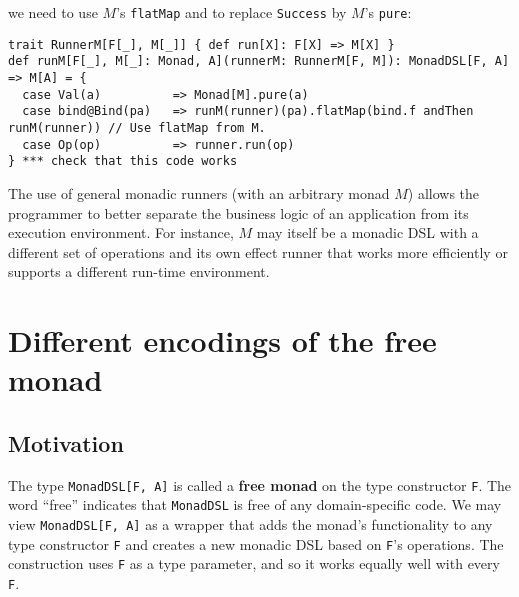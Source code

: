 we need to use $M$\textsf{'}s \lstinline!flatMap!
and to replace \lstinline!Success!
by $M$\textsf{'}s \lstinline!pure!:
\begin{lstlisting}
trait RunnerM[F[_], M[_]] { def run[X]: F[X] => M[X] }
def runM[F[_], M[_]: Monad, A](runnerM: RunnerM[F, M]): MonadDSL[F, A] => M[A] = {
  case Val(a)          => Monad[M].pure(a)
  case bind@Bind(pa)   => runM(runner)(pa).flatMap(bind.f andThen runM(runner)) // Use flatMap from M.
  case Op(op)          => runner.run(op)
} *** check that this code works
\end{lstlisting}
The use of general monadic runners (with an arbitrary monad $M$)
allows the programmer to better separate the business logic of an
application from its execution environment. For instance, $M$ may
itself be a monadic DSL with a different set of operations and its
own effect runner that works more efficiently or supports a different
run-time environment.

\section{Different encodings of the free monad}

\subsection{Motivation}

The type \lstinline!MonadDSL[F, A]!
is called a \textbf{free monad} on the type constructor
\lstinline!F!. The word
\textsf{``}free\textsf{''} indicates that \lstinline!MonadDSL!
is free of any domain-specific code. We may view \lstinline!MonadDSL[F, A]!
as a wrapper that adds the monad\textsf{'}s functionality to any type constructor
\lstinline!F! and creates
a new monadic DSL based on \lstinline!F!\textsf{'}s
operations. The construction uses \lstinline!F!
as a type parameter, and so it works equally well with every \lstinline!F!.

